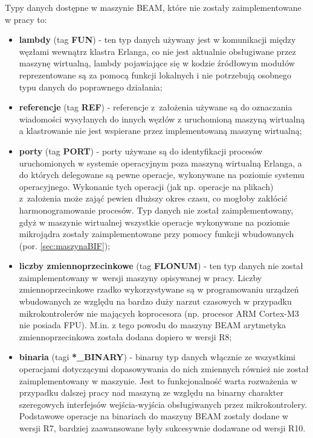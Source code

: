 Typy danych dostępne w maszynie BEAM, które nie zostały zaimplementowane w pracy to:
\begin{itemize}
\item \textbf{lambdy} (tag \textbf{FUN}) - ten typ danych używany jest w komunikacji między węzłami wewnątrz klastra Erlanga, co nie jest aktualnie obsługiwane przez maszynę wirtualną, lambdy pojawiające się w kodzie źródłowym modułów reprezentowane są za pomocą funkcji lokalnych i nie potrzebują osobnego typu danych do poprawnego działania;
\item \textbf{referencje} (tag \textbf{REF}) - referencje z~założenia używane są do oznaczania wiadomości wysyłanych do innych węzłów z uruchomioną maszyną wirtualną a klastrowanie nie jest wspierane przez implementowaną maszynę wirtualną;
\item \textbf{porty} (tag \textbf{PORT}) - porty używane są do identyfikacji procesów uruchomionych w systemie operacyjnym poza maszyną wirtualną Erlanga, a do których delegowane są pewne operacje, wykonywane na poziomie systemu operacyjnego. Wykonanie tych operacji (jak np. operacje na plikach) z~założenia może zająć pewien dłuższy okres czasu, co mogłoby zakłócić harmonogramowanie procesów. Typ danych nie został zaimplementowany, gdyż w maszynie wirtualnej wszystkie operacje wykonywane na poziomie mikrojądra zostały zaimplementowane przy pomocy funkcji wbudowanych (por. \ref{sec:maszynaBIF});
\item \textbf{liczby zmiennoprzecinkowe} (tag \textbf{FLONUM}) - ten typ danych nie został zaimplementowany w~wersji maszyny opisywanej w pracy. Liczby zmiennoprzecinkowe rzadko wykorzystywane są w programowaniu urządzeń wbudowanych ze względu na bardzo duży narzut czasowych w przypadku mikrokontrolerów nie mających koprocesora (np. procesor ARM Cortex-M3 nie posiada FPU). M.in. z tego powodu do maszyny BEAM arytmetyka zmiennoprzecinkowa została dodana dopiero w wersji R8;
\item \textbf{binaria} (tagi \textbf{*\_BINARY}) - binarny typ danych włącznie ze wszystkimi operacjami dotyczącymi dopasowywania do nich zmiennych również nie został zaimplementowany w maszynie. Jest to funkcjonalność warta rozważenia w przypadku dalszej pracy nad maszyną ze względu na binarny charakter szeregowych interfejsów wejścia-wyjścia obsługiwanych przez mikrokontrolery. Podstawowe operacje na binariach do maszyny BEAM zostały dodane w wersji R7, bardziej zaawansowane były sukcesywnie dodawane od wersji R10.
\end{itemize}

